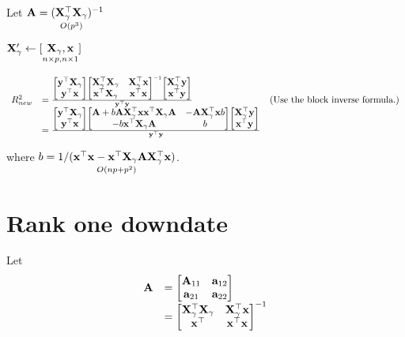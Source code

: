 \documentclass{amsart}
\begin{document}
Let ${\bf A} = (\underset{O(p^3)}{{\bf X}_\gamma^\top {\bf X}_\gamma})^{-1}$

${\bf X}_\gamma' \leftarrow [\underset{n \times p, n \times 1}{{\bf X}_\gamma, {\bf x}}]$

\begin{equation*}
\begin{array}{lll}
R^2_{new} &= \frac{
\begin{bmatrix}
{\bf y}^\top {\bf X}_\gamma \\
{\bf y}^\top {\bf x}
\end{bmatrix}
\begin{bmatrix}
{\bf X}_\gamma^\top {\bf X}_\gamma & {\bf X}_\gamma^\top {\bf x} \\
{\bf x}^\top {\bf X}_\gamma & {\bf x}^\top {\bf x}
\end{bmatrix}^{-1}
\begin{bmatrix}
{\bf X}_\gamma^\top {\bf y} \\
{\bf x}^\top {\bf y}
\end{bmatrix}
}{{\bf y}^\top {\bf y}} & \text{(Use the block inverse formula.)} \\
&= \frac{
\begin{bmatrix}
{\bf y}^\top {\bf X}_\gamma \\
{\bf y}^\top {\bf x}
\end{bmatrix}
\begin{bmatrix}
{\bf A} + b {\bf A} {\bf X}_\gamma^\top {\bf x} {\bf x}^\top {\bf X}_\gamma {\bf A} & -{\bf A} {\bf X}_\gamma^\top {\bf x} b \\
-b {\bf x}^\top {\bf X}_\gamma {\bf A} & b
\end{bmatrix}
\begin{bmatrix}
{\bf X}_\gamma^\top {\bf y} \\
{\bf x}^\top {\bf y}
\end{bmatrix}
}{{\bf y}^\top {\bf y}}
\end{array}
\end{equation*}

where $b = \underset{O(np + p^2)}{1/({\bf x}^\top {\bf x} - {\bf x}^\top {\bf X}_\gamma {\bf A} {\bf X}_\gamma^\top {\bf x})}$.

\section{Rank one downdate}

Let
\begin{equation*}
\begin{array}{ll}
{\bf A} &= \begin{bmatrix}
{\bf A}_{11} & {\bf a}_{12} \\
{\bf a}_{21} & {\bf a}_{22}
\end{bmatrix} \\
&= \begin{bmatrix}
{\bf X}_\gamma^\top {\bf X}_\gamma & {\bf X}_\gamma^\top {\bf x} \\
{\bf x}^\top & {\bf x}^\top {\bf x}
\end{bmatrix}^{-1}
\end{array}
\end{equation*}
\end{document}

